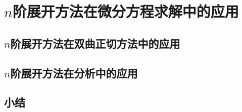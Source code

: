 \chapter{$n$阶展开方法在微分方程求解中的应用}
\section{$n$阶展开方法在双曲正切方法中的应用}
\section{$n$阶展开方法在\Painleve{}分析中的应用}
\section{小结}
